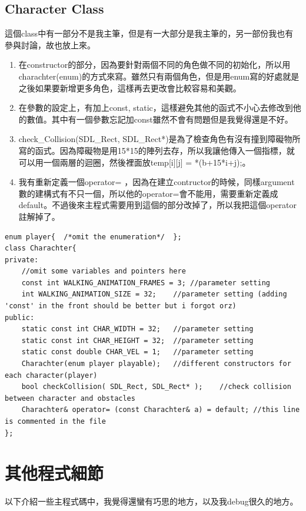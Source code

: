 \documentclass[a4paper]{article}
\theoremstyle{mystyle}	%
\begin{document}
\subsection{Character Class}
這個class中有一部分不是我主筆，但是有一大部分是我主筆的，另一部份我也有參與討論，故也放上來。
\begin{enumerate}
\item 在constructor的部分，因為要針對兩個不同的角色做不同的初始化，所以用\\{\codefont \small charachter(enum)}的方式來寫。雖然只有兩個角色，但是用enum寫的好處就是之後如果要新增更多角色，這樣再去更改會比較容易和美觀。
\item 在參數的設定上，有加上{\codefont \small const, static}，這樣避免其他的函式不小心去修改到他的數值。其中有一個參數忘記加{\codefont \small const}雖然不會有問題但是我覺得還是不好。
\item {\codefont \small check\_Collision(SDL\_Rect, SDL\_Rect*)}是為了檢查角色有沒有撞到障礙物所寫的函式。因為障礙物是用15*15的陣列去存，所以我讓他傳入一個指標，就可以用一個兩層的迴圈，然後裡面放{\codefont \small temp[i][j] = *(b+15*i+j);}。
\item 我有重新定義一個operator= ，因為在建立contructor的時候，同樣argument數的建構式有不只一個，所以他的operator=會不能用，需要重新定義成default。不過後來主程式需要用到這個的部分改掉了，所以我把這個operator註解掉了。
\end{enumerate}
\begin{codefont}
\begin{lstlisting}[caption={Charachter.hpp 20-105}]
enum player{  /*omit the enumeration*/  };
class Charachter{
private:
    //omit some variables and pointers here
    const int WALKING_ANIMATION_FRAMES = 3; //parameter setting
    int WALKING_ANIMATION_SIZE = 32;    //parameter setting (adding 'const' in the front should be better but i forgot orz)
public:
    static const int CHAR_WIDTH = 32;   //parameter setting
    static const int CHAR_HEIGHT = 32;  //parameter setting
    static const double CHAR_VEL = 1;	//parameter setting
    Charachter(enum player playable);	//different constructors for each character(player)
    bool checkCollision( SDL_Rect, SDL_Rect* );    //check collision between character and obstacles
    Charachter& operator= (const Charachter& a) = default; //this line is commented in the file
};
\end{lstlisting}
\end{codefont}
\section{其他程式細節}
以下介紹一些主程式碼中，我覺得還蠻有巧思的地方，以及我debug很久的地方。
\end{document}
